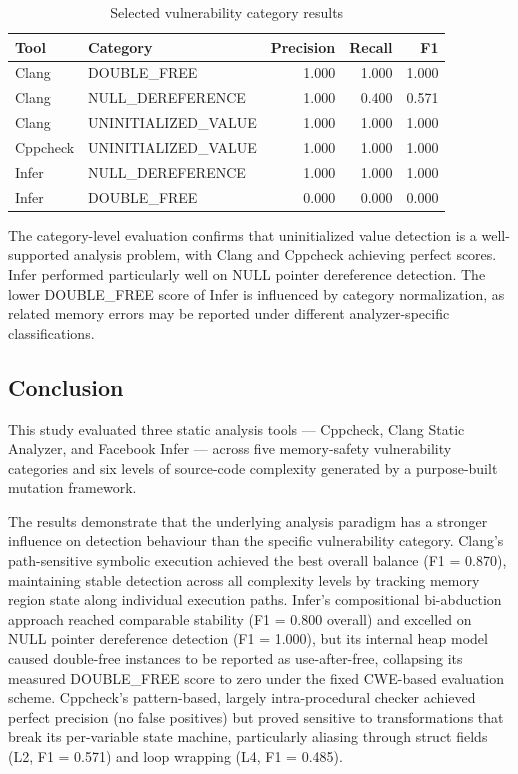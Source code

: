 \documentclass[11pt,a4paper]{article}
\begin{document}
\begin{table}[ht]
\centering
\caption{Selected vulnerability category results}
\begin{tabular}{llrrr}
\hline
Tool & Category & Precision & Recall & F1\\
\hline
Clang & DOUBLE\_FREE & 1.000 & 1.000 & 1.000\\
Clang & NULL\_DEREFERENCE & 1.000 & 0.400 & 0.571\\
Clang & UNINITIALIZED\_VALUE & 1.000 & 1.000 & 1.000\\
\hline
Cppcheck & UNINITIALIZED\_VALUE & 1.000 & 1.000 & 1.000\\
\hline
Infer & NULL\_DEREFERENCE & 1.000 & 1.000 & 1.000\\
Infer & DOUBLE\_FREE & 0.000 & 0.000 & 0.000\\
\hline
\end{tabular}
\label{tab:cwe_results}
\end{table}


The category-level evaluation confirms that uninitialized value detection is a
well-supported analysis problem, with Clang and Cppcheck achieving perfect scores.
Infer performed particularly well on NULL pointer dereference detection. The lower
DOUBLE\_FREE score of Infer is influenced by category normalization, as related
memory errors may be reported under different analyzer-specific classifications.

\subsection{Conclusion}

This study evaluated three static analysis tools — Cppcheck, Clang Static Analyzer, and
Facebook Infer — across five memory-safety vulnerability categories and six levels of
source-code complexity generated by a purpose-built mutation framework.

The results demonstrate that the underlying analysis paradigm has a stronger influence
on detection behaviour than the specific vulnerability category. Clang's path-sensitive
symbolic execution achieved the best overall balance (F1 = 0.870), maintaining stable
detection across all complexity levels by tracking memory region state along individual
execution paths. Infer's compositional bi-abduction approach reached comparable
stability (F1 = 0.800 overall) and excelled on NULL pointer dereference detection
(F1 = 1.000), but its internal heap model caused double-free instances to be
reported as use-after-free, collapsing its measured DOUBLE\_FREE score to zero under
the fixed CWE-based evaluation scheme. Cppcheck's pattern-based, largely
intra-procedural checker achieved perfect precision (no false positives) but proved
sensitive to transformations that break its per-variable state machine, particularly
aliasing through struct fields (L2, F1 = 0.571) and loop wrapping (L4, F1 = 0.485).
\end{document}
